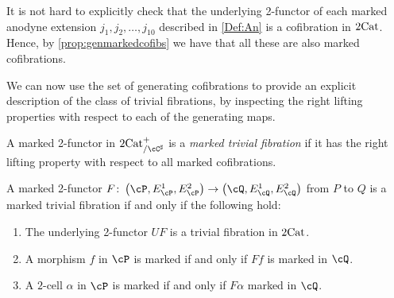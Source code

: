 \documentclass[11pt, dvipsnames]{amsart}
\begin{document}
		\begin{rmk}\label{AnisinCof}
			It is not hard to explicitly check that the underlying 2-functor of each marked anodyne extension $j_1,j_2,\dots,j_{10}$ described in \cref{Def:An} is a  cofibration in $2\mathrm{Cat}$. Hence, by \cref{prop:genmarkedcofibs} we have that all these are also marked cofibrations.
		\end{rmk}

		We can now use the set of generating cofibrations to provide an explicit description of the class of trivial fibrations, by inspecting the right lifting properties with respect to each of the generating maps.

        \begin{defn}
           A marked 2-functor in $\twocat^{+}_{/\cC^\sharp}$ is a \emph{marked trivial fibration} if it has the right lifting property with respect to all marked cofibrations. 
        \end{defn}

		\begin{prop} \label{prop:char_trivfib}
			A marked 2-functor $F\colon \markedscat{\cP} \to \markedscat{\cQ}$ from $P$ to $Q$ is a marked trivial fibration if and only if the following hold:
			\begin{enumerate}[label=\stlabel{prop:char_trivfib}, ref= \arabic*]
				\item \label{prop:char_trivfib.1} The underlying 2-functor $UF$ is a trivial fibration in $2\mathrm{Cat}$.
				\item \label{prop:char_trivfib.2} A morphism $f$ in $\cP$ is marked if and only if $Ff$ is marked in $\cQ$.
				\item \label{prop:char_trivfib.3} A $2$-cell $\alpha$ in $\cP$ is marked if and only if $F\alpha$ marked in $\cQ$.
			\end{enumerate}
		\end{prop}
\end{document}
